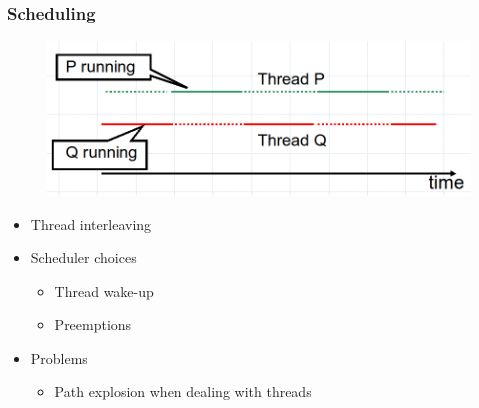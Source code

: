 \documentclass{beamer}
\begin{document}
	\begin{frame}
		\frametitle{Scheduling}
		
		\begin{figure}[htbp]
			\centering
			\includegraphics[scale=0.3]{interleaving}
		\end{figure}
		
		\begin{itemize}
			\item Thread interleaving
			\item Scheduler choices
			\begin{itemize}
				\item Thread wake-up
				\item Preemptions
			\end{itemize}
			\item Problems
			\begin{itemize}
				\item Path explosion when dealing with threads
			\end{itemize}
		\end{itemize}
	\end{frame}
	
\end{document}
